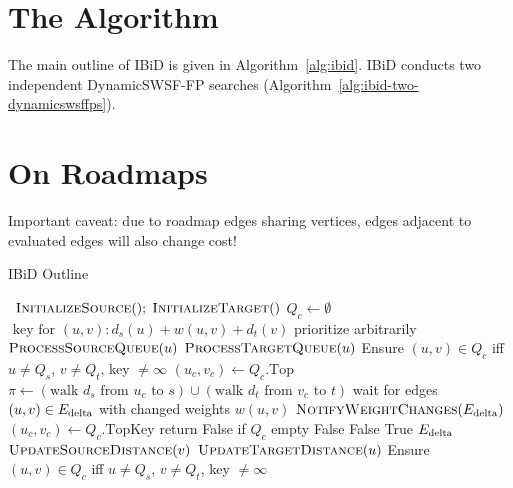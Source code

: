 \section{The Algorithm}

The main outline of IBiD is given in Algorithm~\ref{alg:ibid}.
IBiD conducts two independent DynamicSWSF-FP searches
(Algorithm~\ref{alg:ibid-two-dynamicswsffps}).

\section{On Roadmaps}

Important caveat: due to roadmap edges sharing vertices,
edges adjacent to evaluated edges will also change cost!


\begin{algorithm}[t]
   \caption{IBiD Outline}
   \label{alg:ibid}
   \begin{algorithmic}[1]
       {\,}
         \State $\mbox{\sc InitializeSource}(); \; \mbox{\sc InitializeTarget}()$
         \State $Q_c \gets \emptyset$
            \Comment $\mbox{ key for } (u,v): d_s(u) + w(u,v) + d_t(v)$
         \Loop
                     \Comment prioritize arbitrarily
                  \State $\mbox{\sc ProcessSourceQueue}(u)$
               \Else
                  \State $\mbox{\sc ProcessTargetQueue}(u)$
               \EndIf
               \State Ensure $(u,v) \in Q_c$ iff
                  $u \neq Q_s$, $v \neq Q_t$, key $\neq \infty$
            \EndWhile
            \State $(u_c,v_c) \gets Q_c.\mbox{Top}$
            \State $\pi \gets
               ( \mbox{walk } d_s \mbox{ from } u_c \mbox{ to } s )
               \cup
               ( \mbox{walk } d_t \mbox{ from } v_c \mbox{ to } t )$
            \State wait for edges $(u,v) \in E_{\mbox{\scriptsize delta}}$ with changed weights $w(u,v)$
            \State $\mbox{\sc NotifyWeightChanges}(E_{\mbox{\scriptsize delta}})$
         \EndLoop
      \EndProcedure
       {\,}
         \State $(u_c,v_c) \gets Q_c.\mbox{TopKey}$
            \Comment return False if $Q_c$ empty
            \State \Return False
         \EndIf
            \State \Return False
         \EndIf
         \State \Return True
      \EndFunction
       {$E_{\mbox{\scriptsize delta}}$}
            \State $\mbox{\sc UpdateSourceDistance}(v)$
            \State $\mbox{\sc UpdateTargetDistance}(u)$
         \EndFor
         \State Ensure $(u,v) \in Q_c$ iff
            $u \neq Q_s$, $v \neq Q_t$, key $\neq \infty$
      \EndProcedure
   \end{algorithmic}
\end{algorithm}

